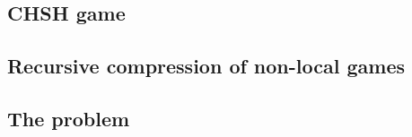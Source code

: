 \subsection{CHSH game}
\subsection{Recursive compression of non-local games}
\subsection{The problem}

